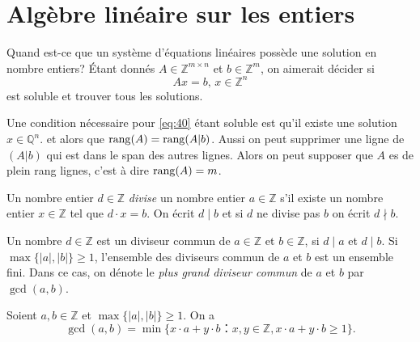 \chapter{Algèbre linéaire sur les entiers}
\label{cha:algebre-lineaire-sur}


Quand est-ce que un système d'équations linéaires possède une solution en nombre entiers? Étant donnés $A ∈ℤ^{m × n}$ et $b ∈ℤ^m$, on aimerait décider si 
\begin{equation}
  \label{eq:40}
  A x = b, \, x ∈ ℤ^n 
\end{equation}
est soluble et trouver tous les solutions.



Une condition nécessaire pour \eqref{eq:40} étant soluble est qu'il existe une solution $x ∈ℚ^n$. et alors que $\operatorname{rang}(A) = \operatorname{rang}(A|b)$. Aussi on peut supprimer une ligne de $(A|b)$ qui est dans le span des autres lignes. Alors on peut supposer que $A$ es de plein rang lignes, c'est à dire $\operatorname{rang}(A) = m$. 

\begin{definition}
  \label{def:44}
  Un nombre entier $d ∈ℤ$ \emph{divise} un nombre entier $a ∈ℤ$ s'il existe un nombre entier $x ∈ℤ$ tel que $d⋅x =b$. On écrit $d\mid b$ et si $d$ ne divise pas $b$ on écrit $d \nmid b$. 
\end{definition}
\begin{definition}
  \label{def:45}
  Un nombre $d ∈ℤ$ est un diviseur commun de $a∈ℤ$ et $b ∈ℤ$, si $d \mid a$ et $d \mid b$. Si $\max\{|a|,|b|\} ≥1$, l'ensemble des diviseurs commun de $a$ et $b$ est un ensemble fini. Dans ce cas, on dénote le \emph{plus grand diviseur commun} de $a$ et $b$ par $\gcd(a,b)$. 
\end{definition}


\begin{theorem}
  \label{thr:48}
  Soient $a,b ∈ℤ$ et $\max\{|a|,|b|\} ≥1$. On a
  \begin{displaymath}
    \gcd(a,b) = \min \{ x ⋅a + y ⋅ b： x,y ∈ℤ,  x ⋅a + y ⋅ b≥1\}.
  \end{displaymath}
\end{theorem}

